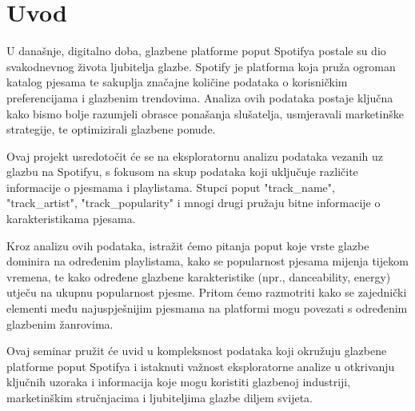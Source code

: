 \chapter{Uvod}

U današnje, digitalno doba, glazbene platforme poput Spotifya postale su dio svakodnevnog života ljubitelja glazbe. Spotify je platforma koja pruža ogroman katalog pjesama te sakuplja značajne količine podataka o korisničkim preferencijama i glazbenim trendovima. Analiza ovih podataka postaje ključna kako bismo bolje razumjeli obrasce ponašanja slušatelja, usmjeravali marketinške strategije, te optimizirali glazbene ponude.

Ovaj projekt usredotočit će se na eksploratornu analizu podataka vezanih uz glazbu na Spotifyu, s fokusom na skup podataka koji uključuje različite informacije o pjesmama i playlistama. Stupci poput "track\_name", "track\_artist", "track\_popularity" i mnogi drugi pružaju bitne informacije o karakteristikama pjesama.

Kroz analizu ovih podataka, istražit ćemo pitanja poput koje vrste glazbe dominira na određenim playlistama, kako se popularnost pjesama mijenja tijekom vremena, te kako određene glazbene karakteristike (npr., danceability, energy) utječu na ukupnu popularnost pjesme. Pritom ćemo razmotriti kako se zajednički elementi među najuspješnijim pjesmama na platformi mogu povezati s određenim glazbenim žanrovima.

Ovaj seminar pružit će uvid u kompleksnost podataka koji okružuju glazbene platforme poput Spotifya i istaknuti važnost eksploratorne analize u otkrivanju ključnih uzoraka i informacija koje mogu koristiti glazbenoj industriji, marketinškim stručnjacima i ljubiteljima glazbe diljem svijeta.


\eject



